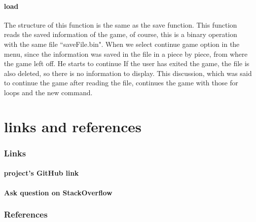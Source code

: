 \documentclass[12pt,a4paper]{article}
\begin{document}
	\subsection{load}
    The structure of this function is the same as the save function. This function reads the saved information of the game, of course, this is a binary operation with the same file ``saveFile.bin".
    When we select continue game option in the menu, since the information was saved in the file in a piece by piece, from where the game left off.
    He starts to continue
    If the user has exited the game, the file is also deleted, so there is no information to display.
    This discussion, which was said to continue the game after reading the file, continues the game with those for loops and the new command.
	\newpage
	\setcounter{section}{0}
	\part{links and references}\label{linkAndRef}
	
	\section{Links}\label{linkAndRef.links}
	\subsection*{project's GitHub link}
	\href{https://github.com/Matin0789/FinalFight.git}{\color{blue}{https://github.com/Matin0789/FinalFight.git}}
	\subsection*{Ask question on StackOverflow}
	\href{https://stackoverflow.com/questions/78060183/declare-array-in-structure-with-specified-size-in-c}{\color{blue}{https://stackoverflow.com/questions/78060183/declare-array-in-structure-with-specified-size-in-c}}
	
	\section{References}\label{linkAndRef.ref}
	 \href{https://www.geeksforgeeks.org/c-plus-plus/}{\color{blue}{https://www.geeksforgeeks.org/c-plus-plus/}}\\
	 \href{https://www.programiz.com/cpp-programming}{\color{blue}{https://www.programiz.com/cpp-programming}}
	 
\end{document}
